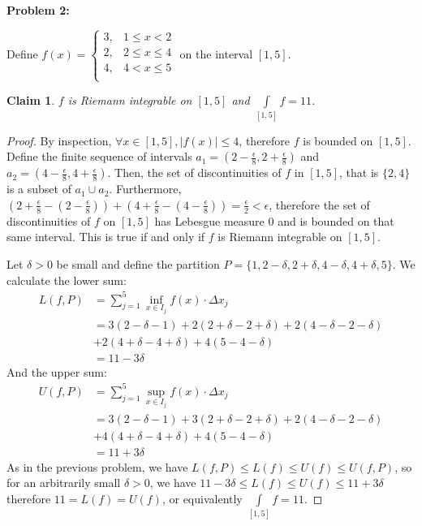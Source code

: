 \documentclass{article}
\newcommand{\eps}{\ensuremath{\epsilon}}
\newcommand{\infx}[1]{\ensuremath{\underset{#1}{\inf}}}
\newcommand{\supx}[1]{\ensuremath{\underset{#1}{\sup}}}
\newtheorem{clm}{Claim}
\begin{document}
\textbf{Problem 2:}

Define $f(x) = \begin{cases}
	3, & 1 \le x < 2 \\
	2, & 2 \le x \le 4 \\
	4, & 4 < x \le 5 \\
\end{cases}$ on the interval $[1,5]$.

\begin{clm}
	$f$ is Riemann integrable on $[1,5]$ and $\underset{[1,5]}{\int}f = 11$.
\end{clm}

\begin{proof}
	By inspection, $\forall x \in [1,5], |f(x)| \le 4$,
	therefore $f$ is bounded on $[1,5]$.
	Define the finite sequence of intervals
	$a_1 = (2-\frac{\eps}{8},2+\frac{\eps}{8})$
	and $a_2 = (4-\frac{\eps}{8}, 4+\frac{\eps}{8})$.
	Then, the set of discontinuities of $f$ in $[1,5]$,
	that is $\{2,4\}$ is a subset of $a_1 \cup a_2$.
	Furthermore, $(2+\frac{\eps}{8} - (2-\frac{\eps}{8})) + 
	(4+\frac{\eps}{8} - (4-\frac{\eps}{8})) = \frac{\eps}{2} < \eps$,
	therefore the set of discontinuities of $f$ on $[1,5]$
	has Lebesgue measure $0$ and is bounded on that same interval.
	This is true if and only if
	$f$ is Riemann integrable on $[1,5]$.
	
	Let $\delta > 0$ be small
	and define the partition
	$P = \{1, 2-\delta, 2+\delta,4-\delta,4+\delta,5\}$.
	We calculate the lower sum:
	\begin{align}
		L(f,P) & =\sum_{j=1}^5 \infx{x \in I_j} f(x) \cdot \Delta x_j \\
		       & = 3(2-\delta-1) + 2(2+\delta - 2+\delta) + 2(4-\delta-2-\delta) \nonumber \\
		       & + 2(4 + \delta - 4 + \delta) + 4(5-4-\delta) \\
		       & = 11-3\delta
	\end{align}
	And the upper sum:
	\begin{align}
		U(f,P) & =\sum_{j=1}^5 \supx{x \in I_j} f(x) \cdot \Delta x_j \\
		       & = 3(2-\delta-1) + 3(2+\delta - 2+\delta) + 2(4-\delta-2-\delta) \nonumber \\
		       & + 4(4 + \delta - 4 + \delta) + 4(5-4-\delta) \\
		       & = 11+3\delta
	\end{align}
	As in the previous problem,
	we have $L(f,P) \le L(f) \le U(f) \le U(f,P)$,
	so for an arbitrarily small $\delta > 0$, we have
	$11-3\delta \le L(f) \le U(f) \le 11 + 3\delta$
	therefore $11 = L(f) = U(f)$,
	or equivalently
	$\underset{[1,5]}{\int}f = 11$.
\end{proof}
\end{document}
